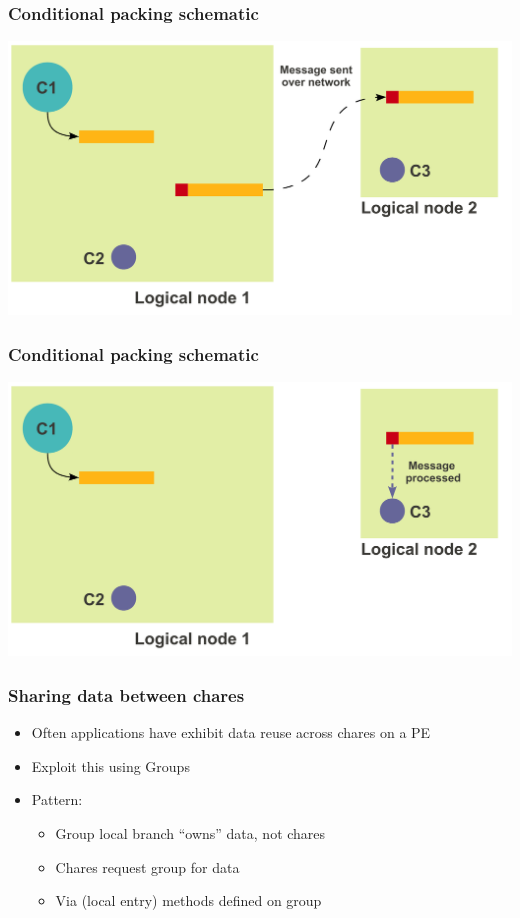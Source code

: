 \begin{frame}[fragile]
  \frametitle{Conditional packing schematic}
  \includegraphics[width=\textwidth]{figures/advancedOpts/fig3_1}
\end{frame}

\begin{frame}[fragile]
  \frametitle{Conditional packing schematic}
  \includegraphics[width=\textwidth]{figures/advancedOpts/fig3_2}
\end{frame}

\begin{frame}[fragile]
  \frametitle{Sharing data between chares}
  \begin{itemize}
  \item Often applications have exhibit data reuse across chares on a PE
  \item Exploit this using Groups
  \item Pattern:
    \begin{itemize}
    \item Group local branch “owns” data, not chares
    \item Chares request group for data
    \item Via (local entry) methods defined on group
    \end{itemize}
  \end{itemize}
\end{frame}

